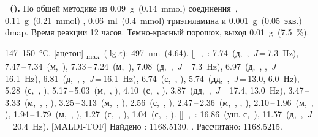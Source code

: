 \textbf{~().} 
По общей методике из \SI{0.09}{\gram}~(\SI{0.14}{\milli\mole}) соединения~, \SI{0.11}{\gram}~(\SI{0.21}{\milli\mole}) , \SI{0.06}{\milli\litre}~(\SI{0.4}{\milli\mole}) триэтиламина и \SI{0.001}{\gram}~(0.05~экв.) \ac{dmap}.
Время реакции 12 часов.
Темно-красный порошок, выход \SI{0.01}{\gram}~(\SI{7.5}{\percent}).
\begin{experimental}
     147--\SI{150}{\celsius}.
    [ацетон] \chemlambda\textsubscript{max}~($\lg \varepsilon$): \SI{497}{\nano\metre}~(4.64).
    []~\chemdelta,~\si{\ppm}: 7.74~(д,~,~\textit{J}\,=\,7.3~\si{\hertz}), 7.47\,--\,7.34~(м,~), 7.33\,--\,7.24~(м,~), 7.08~(д,~,~\textit{J}\,=\,7.3~\si{\hertz}), 6.97~(д,~, ,~\textit{J}\,=\,16.1~\si{\hertz}), 6.81~(д,~, ,~\textit{J}\,=\,16.1~\si{\hertz}), 6.74~(с,~, ), 5.74~(дд,~,~\textit{J}\,=\,13.0, 6.0~\si{\hertz}), 5.28~(с,~, ), 5.17\,--\,5.03~(м,~, ), 4.10~(с,~, ), 3.87~(дд,~,~\textit{J}\,=\,17.4, 13.0~\si{\hertz}), 3.47\,--\,3.33~(м,~, , ), 3.25\,--\,3.13~(м,~, ), 2.56~(с,~, ), 2.47\,--\,2.36~(м,~, , ), 2.10\,--\,1.96~(м,~, ), 1.94\,--\,1.79~(м,~, ), 1.27~(с,~, ), 1.04~(с,~, ).
    []~\chemdelta,~\si{\ppm}: 16.86~(уш. с,~), 11.57~(д,~,~\textit{J}\,=\,20.4~\si{\hertz}).
    [MALDI-TOF] Найдено \ce{[M + H]+}: \num{1168.5130}. . Рассчитано: \ce{[M + H]} \num{1168.5215}.
\end{experimental}
